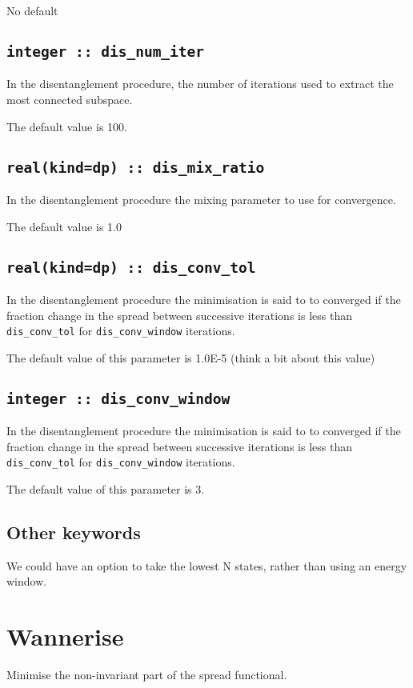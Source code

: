 No default

\subsection[dis\_num\_iter]{\tt integer :: dis\_num\_iter}
In the disentanglement procedure, the
number of iterations used to extract the most connected subspace.

The default value is 100.

\subsection[dis\_mix\_ratio]{\tt real(kind=dp) :: dis\_mix\_ratio}
In the disentanglement procedure the mixing parameter to use for
convergence.

The default value is 1.0

\subsection[dis\_conv\_tol]{\tt real(kind=dp) :: dis\_conv\_tol}

In the disentanglement procedure the minimisation is said to to converged
if the fraction change in the spread between successive
iterations is less than
\verb#dis_conv_tol# for \verb#dis_conv_window# iterations.

The default value of this parameter is 1.0E-5 (think a bit about this value)


\subsection[dis\_conv\_window]{\tt integer :: dis\_conv\_window}

In the disentanglement procedure the minimisation is said to to converged
if the fraction change in the spread between successive
iterations is less than
\verb#dis_conv_tol# for \verb#dis_conv_window# iterations.

The default value of this parameter is 3.


\subsection{Other keywords}
 We could have an option to take the lowest N states, rather than using
 an energy window.



\section{Wannerise}
Minimise the non-invariant part of the spread functional.

